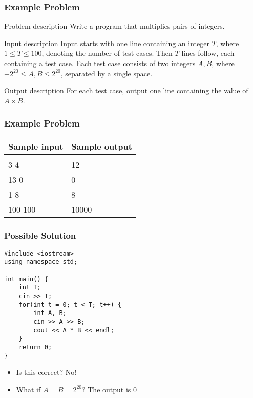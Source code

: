 \documentclass{beamer}
\begin{document}
\begin{frame}[plain]
	\frametitle{Example Problem}
	\begin{block}{Problem description}
    		Write a program that multiplies pairs of integers.
    \end{block}

    \vspace{10pt}
    
    \begin{block}{Input description}
    		Input starts with one line containing an integer $T$, where $1\leq T \leq
    100$, denoting the number of test cases. Then $T$ lines follow, each
    containing a test case. Each test case consists of two integers $A,B$,
    where $-2^{20} \leq A,B \leq 2^{20}$, separated by a single space.
    \end{block}

    \vspace{10pt}
    
    \begin{block}{Output description}
    		For each test case, output one line containing the value of $A\times B$.
    \end{block}
\end{frame}

\begin{frame}[plain]
	\frametitle{Example Problem}
	\begin{center}
		\begin{tabular}{|l|l|}
            \hline
            {\footnotesize Sample input} & {\footnotesize Sample output} \\
            \hline
            \ttfamily
            4 &  \\
            3 4 & 12 \\
            13 0 & 0 \\
            1 8 & 8 \\
            100 100 & 10000 \\
            \hline
        \end{tabular}
    \end{center}
\end{frame}

\begin{frame}
    \frametitle{Possible Solution}
	\begin{scriptsize}
        \begin{verbatim}
#include <iostream>
using namespace std;

int main() {
    int T;
    cin >> T;
    for(int t = 0; t < T; t++) {
        int A, B;
        cin >> A >> B;
        cout << A * B << endl;
    }
    return 0;
}
        \end{verbatim}
    \end{scriptsize}
    \begin{itemize}
       \item<2-> Is this correct?  {\alert{No!}}
       \item<3-> What if $A = B = 2^{20}$?  {The output is $0$ }
    \end{itemize}
\end{frame}
\end{document}
